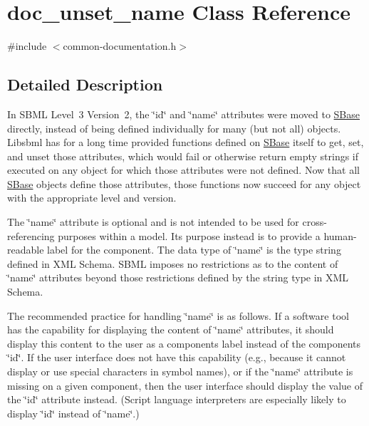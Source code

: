 \hypertarget{classdoc__unset__name}{}\section{doc\+\_\+unset\+\_\+name Class Reference}
\label{classdoc__unset__name}


{\ttfamily \#include $<$common-\/documentation.\+h$>$}



\subsection{Detailed Description}
\begin{DoxyParagraph}{}
In S\+B\+ML Level~3 Version~2, the \char`\"{}id\char`\"{} and \char`\"{}name\char`\"{} attributes were moved to \hyperlink{class_s_base}{S\+Base} directly, instead of being defined individually for many (but not all) objects. Libsbml has for a long time provided functions defined on \hyperlink{class_s_base}{S\+Base} itself to get, set, and unset those attributes, which would fail or otherwise return empty strings if executed on any object for which those attributes were not defined. Now that all \hyperlink{class_s_base}{S\+Base} objects define those attributes, those functions now succeed for any object with the appropriate level and version.
\end{DoxyParagraph}
The \char`\"{}name\char`\"{} attribute is optional and is not intended to be used for cross-\/referencing purposes within a model. Its purpose instead is to provide a human-\/readable label for the component. The data type of \char`\"{}name\char`\"{} is the type {\ttfamily string} defined in X\+ML Schema. S\+B\+ML imposes no restrictions as to the content of \char`\"{}name\char`\"{} attributes beyond those restrictions defined by the {\ttfamily string} type in X\+ML Schema.

The recommended practice for handling \char`\"{}name\char`\"{} is as follows. If a software tool has the capability for displaying the content of \char`\"{}name\char`\"{} attributes, it should display this content to the user as a component\textquotesingle{}s label instead of the component\textquotesingle{}s \char`\"{}id\char`\"{}. If the user interface does not have this capability (e.\+g., because it cannot display or use special characters in symbol names), or if the \char`\"{}name\char`\"{} attribute is missing on a given component, then the user interface should display the value of the \char`\"{}id\char`\"{} attribute instead. (Script language interpreters are especially likely to display \char`\"{}id\char`\"{} instead of \char`\"{}name\char`\"{}.)

